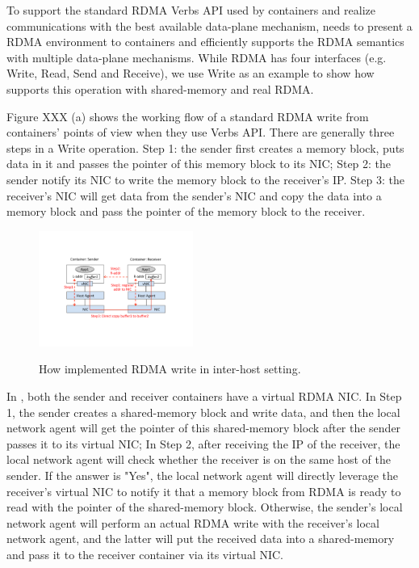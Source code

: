 
To support the standard RDMA Verbs API used by containers and realize
communications with the best available data-plane mechanism, \sysname needs
to present a RDMA environment to containers and efficiently supports 
the RDMA semantics with multiple data-plane mechanisms. 
While RDMA has four interfaces (e.g. Write, Read, Send and Receive), we use Write as an example
to show how \sysname supports this operation with shared-memory and real RDMA.



Figure XXX (a) shows the working flow of a standard RDMA write from containers'
points of view when they use Verbs API. There are generally three steps in a 
Write operation. 
Step 1: the sender first creates a memory block, puts data in it and passes 
the pointer of this memory block to its NIC;
Step 2: the sender notify its NIC to write the memory block to the receiver's IP.
Step 3: the receiver's NIC will get data from the sender's NIC and copy the 
data into a memory block and pass the pointer of the memory block to the 
receiver.

     \begin{figure}[ht]
     \centering 
     \includegraphics[width=0.45\textwidth]{figures/system/sys_rdma_rdma.pdf}      
     \label{fig:sys_rdma_rdma}
     \caption{How \sysname implemented RDMA write in inter-host setting.} 
     \end{figure}

In \sysname, both the sender and receiver containers have a virtual RDMA NIC.
In Step 1, the sender creates a shared-memory block and write data, and then 
the local network agent will get the pointer of this shared-memory block after the sender passes it to its virtual NIC; In Step 2, after receiving the IP of 
the receiver, the local network agent will check whether the receiver is on
the same host of the sender. If the answer is "Yes", the local network agent will
directly leverage the receiver's virtual NIC to notify it that a memory block 
from RDMA is ready to read with the pointer of the shared-memory block. 
Otherwise, the sender's local network agent will perform an actual RDMA write
with the receiver's local network agent, and the latter will put the received data into a shared-memory and pass it to the receiver container via its virtual NIC.
     

